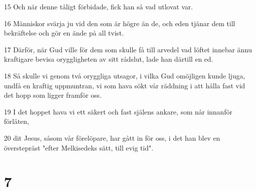 \par 15 Och när denne tåligt förbidade, fick han så vad utlovat var.
\par 16 Människor svärja ju vid den som är högre än de, och eden tjänar dem till bekräftelse och gör en ände på all tvist.
\par 17 Därför, när Gud ville för dem som skulle få till arvedel vad löftet innebar ännu kraftigare bevisa oryggligheten av sitt rådslut, lade han därtill en ed.
\par 18 Så skulle vi genom två oryggliga utsagor, i vilka Gud omöjligen kunde ljuga, undfå en kraftig uppmuntran, vi som hava sökt vår räddning i att hålla fast vid det hopp som ligger framför oss.
\par 19 I det hoppet hava vi ett säkert och fast själens ankare, som når innanför förlåten,
\par 20 dit Jesus, såsom vår förelöpare, har gått in för oss, i det han blev en överstepräst "efter Melkisedeks sätt, till evig tid".

\chapter{7}

